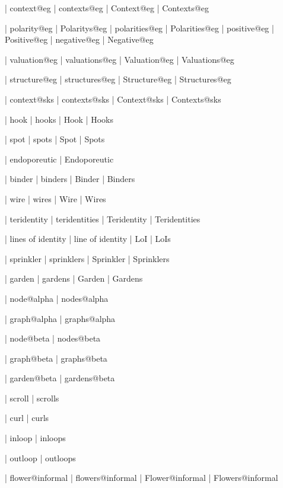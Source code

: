  | context@eg
 | contexts@eg
 | Context@eg
 | Contexts@eg

 | polarity@eg
 | Polaritys@eg
 | polarities@eg
 | Polarities@eg
 | positive@eg
 | Positive@eg
 | negative@eg
 | Negative@eg

 | valuation@eg
 | valuations@eg
 | Valuation@eg
 | Valuations@eg

 | structure@eg
 | structures@eg
 | Structure@eg
 | Structures@eg

 | context@sks
 | contexts@sks
 | Context@sks
 | Contexts@sks

 | hook
 | hooks
 | Hook
 | Hooks

 | spot
 | spots
 | Spot
 | Spots
 
 | endoporeutic
 | Endoporeutic

 | binder
 | binders
 | Binder
 | Binders

 | wire
 | wires
 | Wire
 | Wires

 | teridentity
 | teridentities
 | Teridentity
 | Teridentities

 | lines of identity
 | line of identity
 | LoI
 | LoIs

 | sprinkler
 | sprinklers
 | Sprinkler
 | Sprinklers

 | garden
 | gardens
 | Garden
 | Gardens

 | node@alpha
 | nodes@alpha

 | graph@alpha
 | graphs@alpha

 | node@beta
 | nodes@beta

 | graph@beta
 | graphs@beta

 | garden@beta
 | gardens@beta


 | scroll
 | scrolls

 | curl
 | curls

 | inloop
 | inloops

 | outloop
 | outloops

 | flower@informal
 | flowers@informal
 | Flower@informal
 | Flowers@informal

